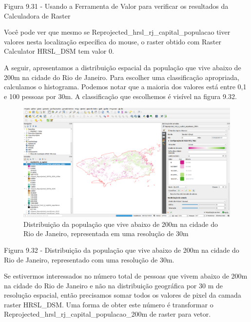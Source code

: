 \documentclass[
]{book}
\begin{document}
Figura 9.31 - Usando a Ferramenta de Valor para verificar os resultados da Calculadora de Raster

Você pode ver que mesmo se Reprojected\_hrsl\_rj\_capital\_populacao tiver valores nesta localização específica do mouse, o raster obtido com Raster Calculator HRSL\_DSM tem valor 0.

A seguir, apresentamos a distribuição espacial da população que vive abaixo de 200m na \hspace{0pt}\hspace{0pt}cidade do Rio de Janeiro. Para escolher uma classificação apropriada, calculamos o histograma. Podemos notar que a maioria dos valores está entre 0,1 e 100 pessoas por 30m. A classificação que escolhemos é visível na figura 9.32.

\begin{figure}
\centering
\includegraphics{media/modulo9/fig932.png}
\caption{Distribuição da população que vive abaixo de 200m na \hspace{0pt}\hspace{0pt}cidade do Rio de Janeiro, representada em uma resolução de 30m}
\end{figure}

Figura 9.32 - Distribuição da população que vive abaixo de 200m na \hspace{0pt}\hspace{0pt}cidade do Rio de Janeiro, representado com uma resolução de 30m.

Se estivermos interessados \hspace{0pt}\hspace{0pt}no número total de pessoas que vivem abaixo de 200m na \hspace{0pt}\hspace{0pt}cidade do Rio de Janeiro e não na distribuição geográfica por 30 m de resolução espacial, então precisamos somar todos os valores de pixel da camada raster HRSL\_DSM. Uma forma de obter este número é transformar o Reprojected\_hrsl\_rj\_capital\_populacao\_200m de raster para vetor.
\end{document}
